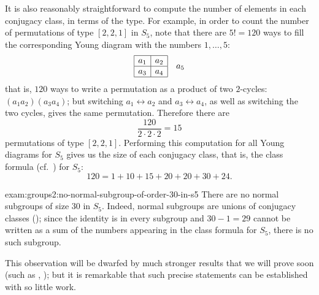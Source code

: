 It is also reasonably straightforward to compute the number of
elements in each conjugacy class, in terms of the type. For example,
in order to count the number of permutations of type $[2,2,1]$ in
$S_5$, note that there are $5! = 120$ ways to fill the corresponding
Young diagram with the numbers $1,\dots,5$:
\[
  \begin{array}{|c|c|}
    \hline
    a_1 & a_2 \\ \hline
    a_3 & a_4 \\ \hline
  \end{array}
  \quad a_5
\]
that is, $120$ ways to write a permutation as a product of two
$2$-cycles: $(a_1 a_2)(a_3 a_4)$; but switching
$a_1 \leftrightarrow a_2$ and $a_3 \leftrightarrow a_4$, as well as
switching the two cycles, gives the same permutation. Therefore there
are
\[
  \frac{120}{2 \cdot 2 \cdot 2} = 15
\]
permutations of type $[2,2,1]$. Performing this computation for all
Young diagrams for $S_5$ gives us the size of each conjugacy class,
that is, the class formula
(cf.~)
for $S_5$:
\[
  120 = 1 + 10 + 15 + 20 + 20 + 30 + 24.
\]
\begin{exam}{}{exam:groups2:no-normal-subgroup-of-order-30-in-s5}
  There are no normal subgroups of size $30$ in $S_5$. Indeed, normal
  subgroups are unions of conjugacy classes
  (); since the identity is
  in every subgroup and $30 - 1 = 29$ cannot be written as a sum of
  the numbers appearing in the class formula for $S_5$, there is no
  such subgroup.
\end{exam}

This observation will be dwarfed by much stronger results that we will
prove soon (such as ,
); but it is remarkable that such
precise statements can be established with so little work.

